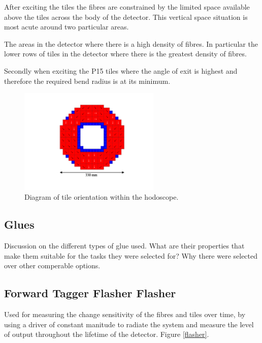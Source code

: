 After exciting the tiles the fibres are constrained by the limited space available above the tiles across the body of the detector. This vertical space situation is most acute around two particular areas.

The areas in the detector where there is a high density of fibres. In particular the lower rows of tiles in the detector where there is the greatest density of fibres. 

Secondly when exciting the P15 tiles where the angle of exit is highest and therefore the required bend radius is at its minimum.

\begin{figure}
	\centering
	\includegraphics[width=0.6\textwidth]{ImgChap1/hodoorientation}
	\caption{Diagram of tile orientation within the hodoscope.}
	\label{TileOrientation}
\end{figure}

\subsection{Glues}

Discussion on the different types of glue used. What are their properties that make them suitable for the tasks they were selected for? Why there were selected over other comperable options.

\cite{kobayashi1991transmittance}
\cite{kirn1999absorption}
\cite{clements2006selection}
\cite{montecchi2001study}
\cite{cohen2003optical}
\cite{cohen2001optical}
\cite{va2014optical}

\subsection{Forward Tagger Flasher Flasher}

Used for measuring the change sensitivity of the fibres and tiles over time, by using a driver of constant manitude to radiate the system and measure the level of output throughout the lifetime of the detector. Figure \ref{flasher}.


